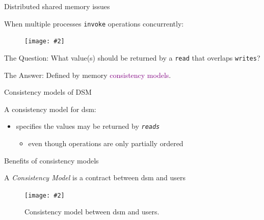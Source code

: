 \documentclass{beamer}
\makeatletter
\newcommand{\citeinbeamer}[3]{{\scriptsize{\textcolor{blue}{[#1@#2'#3]}}}}
\newcommand{\fignocaption}[2]
{
  \begin{figure}[htp]
    \centering
      \texttt{[image: \#2]}
  \end{figure}
}
\newcommand{\fig}[3]
{
  \begin{figure}[htp]
    \centering
      \texttt{[image: \#2]}
      \caption[labelInTOC]{#3}
  \end{figure}
}
\newcommand{\largepurple}[1]{\textcolor{purple}{\large #1}}
\newcommand{\boxedpoint}[1]{
  \begin{center}
    \fbox{\textcolor{red}{\bf #1}}
  \end{center}
}
\newcommand{\boxedpointblue}[1]{
  \begin{center}
    \fbox{\textcolor{blue}{\bf #1}}
  \end{center}
}
\makeatother
\begin{document}
\begin{frame}{Distributed shared memory issues}
  \begin{exampleblock}{When multiple processes \texttt{invoke} operations
  concurrently:}
    \fignocaption{width = 0.55\textwidth}{fig/concurrent-what-value.pdf}
  \end{exampleblock}

  \begin{block}{The Question:}
    What value(s) should be returned by a \texttt{read} that overlaps
    \texttt{writes}?
  \end{block}

  \begin{block}{The Answer:}
    Defined by memory \largepurple{consistency models}.
  \end{block}
\end{frame}
\begin{frame}{Consistency models of DSM}
  \begin{definition}[Consistency model \citeinbeamer{Steinke}{JACM}{04}]
    A consistency model for dsm:
    \begin{itemize}
      \item specifies the values may be returned by \texttt{\it reads}
        \begin{itemize}
          \item even though operations are only partially ordered
        \end{itemize}
    \end{itemize}
  \end{definition}


  \boxedpointblue{that is, specification of the allowable behavior of dsm.}
  \boxedpoint{thereby defining the semantics of shared registers/variables.}

\end{frame}
\begin{frame}{Benefits of consistency models}
  \begin{block}{A {\it Consistency Model} is a contract between dsm and users}
    \fig{width = 0.55\textwidth}{fig/consistency-model-contract.pdf}
    {Consistency model between dsm and users.}
  \end{block}
\end{frame}
\end{document}
